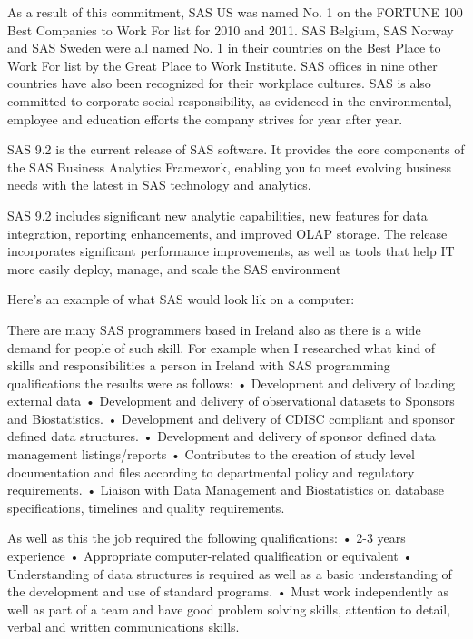 As a result of this commitment, SAS US was named No. 1 on the FORTUNE 100 Best Companies to Work For list for 2010 and 2011. SAS Belgium, SAS Norway and SAS Sweden were all named No. 1 in their countries on the Best Place to Work For list by the Great Place to Work Institute. SAS offices in nine other countries have also been recognized for their workplace cultures.
SAS is also committed to corporate social responsibility, as evidenced in the environmental, employee and education efforts the company strives for year after year.

SAS 9.2 is the current release of SAS software. It provides the core components of the SAS Business Analytics Framework, enabling you to meet evolving business needs with the latest in SAS technology and analytics.

SAS 9.2 includes significant new analytic capabilities, new features for data integration, reporting enhancements, and improved OLAP storage. The release incorporates significant performance improvements, as well as tools that help IT more easily deploy, manage, and scale the SAS environment

Here’s an example of what SAS would look lik on a computer: 

 

There are many SAS programmers based in Ireland also as there is a wide demand for people of such skill. For example when I researched what kind of skills and responsibilities a person in Ireland with SAS programming qualifications the results were as follows:
• Development and delivery of loading external data
• Development and delivery of observational datasets to Sponsors and Biostatistics. 
• Development and delivery of CDISC compliant and sponsor defined data structures.
• Development and delivery of sponsor defined data management listings/reports
• Contributes to the creation of study level documentation and files according to departmental policy and regulatory requirements.
• Liaison with Data Management and Biostatistics on database specifications, timelines and quality requirements.

As well as this the job required the following qualifications:
• 2-3 years experience
• Appropriate computer-related qualification or equivalent
• Understanding of data structures is required as well as a basic understanding of the development and use of standard programs.
• Must work independently as well as part of a team and have good problem solving skills, attention to detail, verbal and written communications skills.



